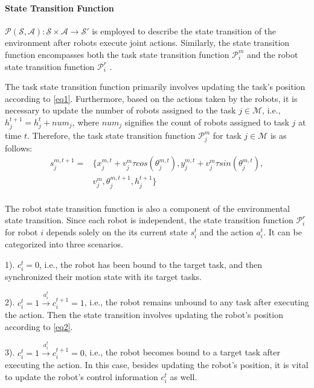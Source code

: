 \documentclass[lettersize,journal]{IEEEtran}
\begin{document}
\paragraph{\textbf{State Transition Function}}$\mathcal{P}(\mathcal{S},\mathcal{A})\colon\mathcal{S}\times\mathcal{A}\to\mathcal{S}'$ is employed to describe the state transition of the environment after robots execute joint actions. Similarly, the state transition function encompasses both the task state transition function $\mathcal{P}_i^m$ and the robot state transition function $\mathcal{P}_i^r$ .

The task state transition function primarily involves updating the task's position according to \eqref {eq1}.  Furthermore, based on the actions taken by the robots, it is necessary to update the number of robots assigned to the task $j\in\mathcal{M}$, i.e., $h_j^{t+1}=h_j^{t}+num_j$, where $num_j$ signifies the count of robots assigned to task $j$ at time $t$. Therefore, the task state transition function $\mathcal{P}_j^m$ for task $j\in\mathcal{M}$ is as follows:
\begin{equation}
        \begin{aligned} 
            s_j^{m,t+1}=
            & \{x_j^{m,t}+v_j^m\tau cos(\theta_j^{m,t}),y_j^{m,t}+v_j^m\tau sin(\theta_j^{m,t}),\\
            & v_j^m,\theta_j^{m,t+1},h_j^{t+1}\}\label{eqn}\\
        \end{aligned}
\end{equation}

The robot state transition function is also a component of the environmental state transition. Since each robot is independent, the state transition function $\mathcal{P}_i^r$ for robot $i$ depends solely on the its current state $s_i^t$ and the action $a_i^t$. It can be categorized into three scenarios. 

 1). $c_i^t=0$, i.e., the robot has been bound to the target task, and  then synchronized their motion state with its target tasks.

2). $c_i^t=1\overset{a_i^t}{\to}c_i^{t+1}=1$, i.e., the robot remains unbound to any task after executing the action. Then the state transition  involves updating the robot's position according to \eqref {eq2}. 

3). $c_i^t=1\overset{a_i^t}{\to}c_i^{t+1}=0$, i.e., the robot becomes bound to a target task after executing the action. In this case, besides updating the robot's position, it is vital to update the robot's control information $c_i^t$ as well.
\end{document}
